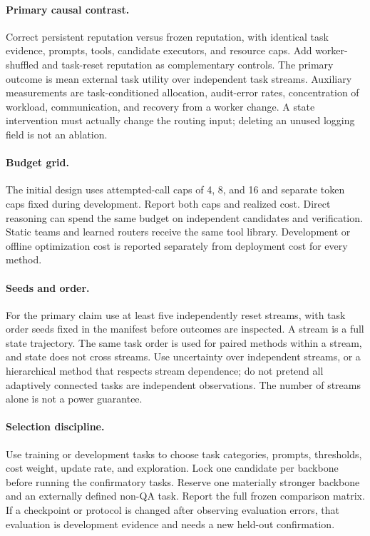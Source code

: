\documentclass[sigconf,anonymous]{aamas}
\begin{document}
\paragraph{Primary causal contrast.}
Correct persistent reputation versus frozen reputation, with identical task evidence, prompts, tools, candidate executors, and resource caps. Add worker-shuffled and task-reset reputation as complementary controls. The primary outcome is mean external task utility over independent task streams. Auxiliary measurements are task-conditioned allocation, audit-error rates, concentration of workload, communication, and recovery from a worker change. A state intervention must actually change the routing input; deleting an unused logging field is not an ablation.

\paragraph{Budget grid.}
The initial design uses attempted-call caps of 4, 8, and 16 and separate token caps fixed during development. Report both caps and realized cost. Direct reasoning can spend the same budget on independent candidates and verification. Static teams and learned routers receive the same tool library. Development or offline optimization cost is reported separately from deployment cost for every method.

\paragraph{Seeds and order.}
For the primary claim use at least five independently reset streams, with task order seeds fixed in the manifest before outcomes are inspected. A stream is a full state trajectory. The same task order is used for paired methods within a stream, and state does not cross streams. Use uncertainty over independent streams, or a hierarchical method that respects stream dependence; do not pretend all adaptively connected tasks are independent observations. The number of streams alone is not a power guarantee.

\paragraph{Selection discipline.}
Use training or development tasks to choose task categories, prompts, thresholds, cost weight, update rate, and exploration. Lock one candidate per backbone before running the confirmatory tasks. Reserve one materially stronger backbone and an externally defined non-QA task. Report the full frozen comparison matrix. If a checkpoint or protocol is changed after observing evaluation errors, that evaluation is development evidence and needs a new held-out confirmation.
\end{document}

